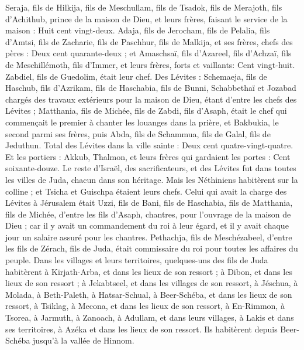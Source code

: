 \begin{multicols}{2}
Seraja, fils de Hilkija, fils de Meschullam, fils de Tsadok, fils de Merajoth, fils d'Achithub, prince de la maison de Dieu,
et leurs frères, faisant le service de la maison : Huit cent vingt-deux. Adaja, fils de Jerocham, fils de Pelalia, fils d’Amtsi, fils de Zacharie, fils de Paschhur, fils de Malkija,
et ses frères, chefs des pères : Deux cent quarante-deux ; et Amaschsaï, fils d'Azareel, fils d'Achzaï, fils de Meschillémoth, fils d'Immer,
et leurs frères, forts et vaillants: Cent vingt-huit. Zabdiel, fils de Guedolim, était leur chef.
Des Lévites : Schemaeja, fils de Haschub, fils d'Azrikam, fils de Haschabia, fils de Bunni,
Schabbethaï et Jozabad chargés des travaux extérieurs pour la maison de Dieu, étant d'entre les chefs des Lévites ;
Matthania, fils de Michée, fils de Zabdi, fils d'Asaph, était le chef qui commençait le premier à chanter les louanges dans la prière, et Bakbukia, le second parmi ses frères, puis Abda, fils de Schammua, fils de Galal, fils de Jeduthun.
Total des Lévites dans la ville sainte : Deux cent quatre-vingt-quatre.
Et les portiers : Akkub, Thalmon, et leurs frères qui gardaient les portes : Cent soixante-douze.
Le reste d’Israël, des sacrificateurs, et des Lévites fut dans toutes les villes de Juda, chacun dans son héritage.
Mais les Néthiniens habitèrent sur la colline ; et Tsicha et Guischpa étaient leurs chefs.
Celui qui avait la charge des Lévites à Jérusalem était Uzzi, fils de Bani, fils de Haschabia, fils de Matthania, fils de Michée, d'entre les fils d'Asaph, chantres, pour l'ouvrage de la maison de Dieu ;
car il y avait un commandement du roi à leur égard, et il y avait chaque jour un salaire assuré pour les chantres.
Pethachja, fils de Meschézabeel, d'entre les fils de Zérach, fils de Juda, était commissaire du roi pour toutes les affaires du peuple.
Dans les villages et leurs territoires, quelques-uns des fils de Juda habitèrent à Kirjath-Arba, et dans les lieux de son ressort ; à Dibon, et dans les lieux de son ressort ; à Jekabtseel, et dans les villages de son ressort,
à Jéschua, à Molada, à Beth-Paleth,
à Hatsar-Schual, à Beer-Schéba, et dans les lieux de son ressort,
à Tsiklag, à Mecona, et dans les lieux de son ressort,
à En-Rimmon, à Tsorea, à Jarmuth,
à Zanoach, à Adullam, et dans leurs villages, à Lakis et dans ses territoires, à Azéka et dans les lieux de son ressort. Ils habitèrent depuis Beer-Schéba jusqu'à la vallée de Hinnom.

\end{multicols}
